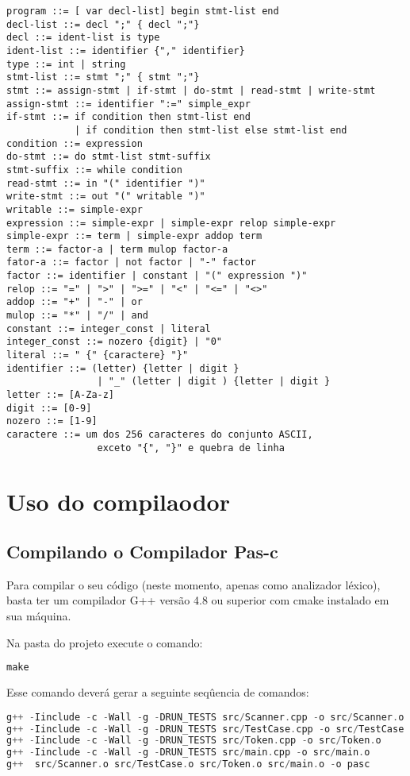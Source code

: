 \documentclass[11pt]{article}
\begin{document}
		\begin{lstlisting}
program ::= [ var decl-list] begin stmt-list end
decl-list ::= decl ";" { decl ";"}
decl ::= ident-list is type
ident-list ::= identifier {"," identifier}
type ::= int | string
stmt-list ::= stmt ";" { stmt ";"}
stmt ::= assign-stmt | if-stmt | do-stmt | read-stmt | write-stmt
assign-stmt ::= identifier ":=" simple_expr
if-stmt ::= if condition then stmt-list end 
			| if condition then stmt-list else stmt-list end
condition ::= expression
do-stmt ::= do stmt-list stmt-suffix
stmt-suffix ::= while condition
read-stmt ::= in "(" identifier ")"
write-stmt ::= out "(" writable ")"
writable ::= simple-expr
expression ::= simple-expr | simple-expr relop simple-expr
simple-expr ::= term | simple-expr addop term
term ::= factor-a | term mulop factor-a
fator-a ::= factor | not factor | "-" factor
factor ::= identifier | constant | "(" expression ")"
relop ::= "=" | ">" | ">=" | "<" | "<=" | "<>"
addop ::= "+" | "-" | or
mulop ::= "*" | "/" | and
constant ::= integer_const | literal
integer_const ::= nozero {digit} | "0"
literal ::= " {" {caractere} "}"
identifier ::= (letter) {letter | digit } 
				| "_" (letter | digit ) {letter | digit }
letter ::= [A-Za-z]
digit ::= [0-9]
nozero ::= [1-9]
caractere ::= um dos 256 caracteres do conjunto ASCII, 
				exceto "{", "}" e quebra de linha
		\end{lstlisting}

\newpage
\section{Uso do compilaodor}

	
	\subsection{Compilando o Compilador Pas-c}

		Para compilar o seu código (neste momento, apenas como analizador léxico), basta ter um compilador G++ versão 4.8 ou superior com cmake instalado em sua máquina.
		
		Na pasta do projeto execute o comando:
\begin{lstlisting}[language=C++]
make
\end{lstlisting} 
		
		Esse comando deverá gerar a seguinte seqûencia de comandos:
\begin{lstlisting}[language=C++]
g++ -Iinclude -c -Wall -g -DRUN_TESTS src/Scanner.cpp -o src/Scanner.o
g++ -Iinclude -c -Wall -g -DRUN_TESTS src/TestCase.cpp -o src/TestCase.o
g++ -Iinclude -c -Wall -g -DRUN_TESTS src/Token.cpp -o src/Token.o
g++ -Iinclude -c -Wall -g -DRUN_TESTS src/main.cpp -o src/main.o
g++  src/Scanner.o src/TestCase.o src/Token.o src/main.o -o pasc
\end{lstlisting}
		
\end{document}

